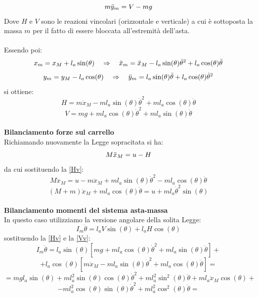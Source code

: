 \begin{equation}\notag
m\ddot{y}_m=V-mg
\end{equation}
Dove $H$ e $V$ sono le reazioni vincolari (orizzontale e verticale) a cui è sottoposta la massa $m$ per il fatto di essere bloccata all'estremità dell'asta.\\\\
Essendo poi:\\
\begin{equation}\notag
x_m = x_M+l_a\sin(\theta) \quad \Rightarrow \quad \ddot{x}_m=\ddot{x}_M-l_a\sin(\theta)\dot{\theta}^2+l_a\cos(\theta)\ddot{\theta}
\end{equation}
\begin{equation}\notag
y_m=y_M-l_a\cos(\theta) \quad \Rightarrow \quad \ddot{y}_m=l_a\sin(\theta)\ddot{\theta}+l_a\cos(\theta)\dot{\theta}^2
\end{equation}
si ottiene:
\begin{equation}\label{Hv}
H=m\ddot{x}_M-ml_a\sin(\theta)\dot{\theta}^2+ml_a\cos(\theta)\ddot{\theta}
\end{equation}
\begin{equation}\label{Vv}
V=mg+ml_a\cos(\theta)\dot{\theta}^2+ml_a\sin(\theta)\ddot{\theta}
\end{equation}\\
\textbf{Bilanciamento forze sul carrello}\\
Richiamando nuovamente la Legge sopracitata si ha:
\begin{equation}\notag
M\ddot{x}_M=u-H
\end{equation}
da cui sostituendo la \ref{Hv}:
$$
M\ddot{x}_M=u-m\ddot{x}_M+ml_a\sin(\theta)\dot{\theta}^2-ml_a\cos(\theta)\ddot{\theta}
$$
\begin{equation}\label{FCarr}
(M+m)\ddot{x}_M+ml_a\cos(\theta)\ddot{\theta}=u+ml_a\dot{\theta}^2\sin(\theta)
\end{equation}\\
\textbf{Bilanciamento momenti del sistema asta-massa}\\
In questo caso utilizziamo la versione angolare della solita Legge:
\begin{equation}
I_m\ddot{\theta}=l_aV\sin(\theta)+l_aH\cos(\theta)
\end{equation}
sostituendo la \ref{Hv} e la \ref{Vv}:
$$
I_m\ddot{\theta}=l_a\sin(\theta)[mg+ml_a\cos(\theta)\dot{\theta}^2+ml_a\sin(\theta)\ddot{\theta}]+$$$$+l_a\cos(\theta)[m\ddot{x}_M-ml_a\sin(\theta)\dot{\theta}^2+ml_a\cos(\theta)\ddot{\theta}]=
$$
$$
=mgl_a\sin(\theta)+ml_a^2\sin(\theta)\cos(\theta)\dot{\theta}^2+ml_a^2\sin^2(\theta)\ddot{\theta}+ml_a\ddot{x}_M\cos(\theta)+$$$$-ml_a^2\cos(\theta)\sin(\theta)\dot{\theta}^2
+ml_a^2\cos^2(\theta)\ddot{\theta}=$$
